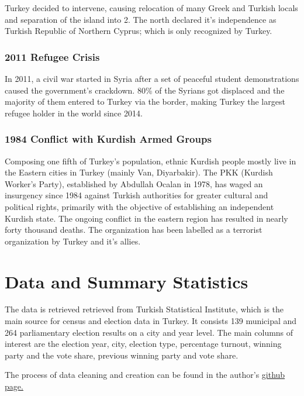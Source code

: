 \documentclass[12pt]{article}
\begin{document}
Turkey decided to intervene, causing relocation of many Greek and Turkish locals and separation of the island into 2. The north declared it's independence as Turkish Republic of Northern Cyprus; which is only recognized by Turkey. 

\subsubsection{2011 Refugee Crisis}

In 2011, a civil war started in Syria after a set of peaceful student demonstrations caused the government's crackdown. 80\% of the Syrians got displaced and the majority of them entered to Turkey via the border, making Turkey the largest refugee holder in the world since 2014. 

\subsubsection{1984 Conflict with Kurdish Armed Groups}

Composing one fifth of Turkey's population, ethnic Kurdish people mostly live in the Eastern cities in Turkey (mainly Van, Diyarbakir). The PKK (Kurdish Worker's Party), established by Abdullah Ocalan in 1978, has waged an insurgency since 1984 against Turkish authorities for greater cultural and political rights, primarily with the objective of establishing an independent Kurdish state. The ongoing conflict in the eastern region has resulted in nearly forty thousand deaths. The organization has been labelled as a terrorist organization by Turkey and it's allies. 


\section{Data and Summary Statistics}

The data is retrieved retrieved from Turkish Statistical Institute, which is the main source for census and election data in Turkey. It consists 139 municipal and 264 parliamentary election results on a city and year level. The main columns of interest are the election year, city, election type, percentage turnout, winning party and the vote share, previous winning party and vote share. 



The process of data cleaning and creation can be found in the author's \href{https://github.com/deniztokmakoglu/turkish_election_analysis}{github page.}
\end{document}
